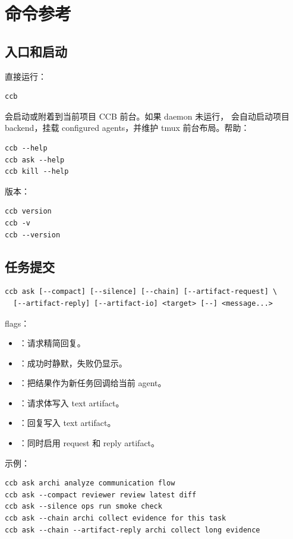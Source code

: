 \chapter{命令参考}

\section{入口和启动}

直接运行：

\begin{lstlisting}
ccb
\end{lstlisting}

会启动或附着到当前项目 CCB 前台。如果 daemon 未运行， 会自动启动项目 backend，挂载 configured agents，并维护 tmux 前台布局。帮助：

\begin{lstlisting}
ccb --help
ccb ask --help
ccb kill --help
\end{lstlisting}

版本：

\begin{lstlisting}
ccb version
ccb -v
ccb --version
\end{lstlisting}

\section{任务提交}

\begin{lstlisting}
ccb ask [--compact] [--silence] [--chain] [--artifact-request] \
  [--artifact-reply] [--artifact-io] <target> [--] <message...>
\end{lstlisting}

flags：

\begin{itemize}
  \item {}：请求精简回复。
  \item {}：成功时静默，失败仍显示。
  \item {}：把结果作为新任务回调给当前 agent。
  \item {}：请求体写入 text artifact。
  \item {}：回复写入 text artifact。
  \item {}：同时启用 request 和 reply artifact。
\end{itemize}

示例：

\begin{lstlisting}
ccb ask archi analyze communication flow
ccb ask --compact reviewer review latest diff
ccb ask --silence ops run smoke check
ccb ask --chain archi collect evidence for this task
ccb ask --chain --artifact-reply archi collect long evidence
\end{lstlisting}

